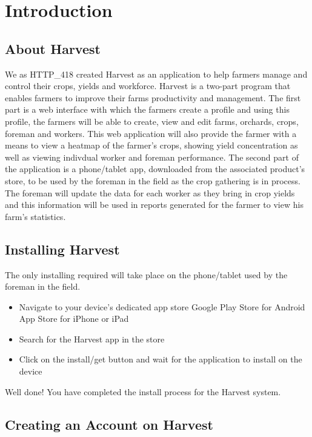 \documentclass[11pt,fleqn]{book} %
\begin{document}

\chapter{Introduction}
	\section{About Harvest}
		We as HTTP\_418 created Harvest as an application to help farmers manage and control their crops, yields and workforce. Harvest is a two-part program that enables farmers to improve their farms productivity and management. The first part is a web interface with which the farmers create a profile and using this profile, the farmers will be able to create, view and edit farms, orchards, crops, foreman and workers. This web application will also provide the farmer with a means to view a heatmap of the farmer's crops, showing yield concentration as well as viewing indivdual worker and foreman performance. The second part of the application is a phone/tablet app, downloaded from the associated product's store, to be used by the foreman in the field as the crop gathering is in process. The foreman will update the data for each worker as they bring in crop yields and this information will be used in reports generated for the farmer to view his farm's statistics.
	\section{Installing Harvest}
		The only installing required will take place on the phone/tablet used by the foreman in the field.
		\begin{itemize}
			\item Navigate to your device's dedicated app store
				\subitem Google Play Store for Android
				\subitem App Store for iPhone or iPad
			\item Search for the Harvest app in the store
			\item Click on the install/get button and wait for the application to install on the device
		\end{itemize}
		Well done! You have completed the install process for the Harvest system.
	\section{Creating an Account on Harvest}
\end{document}
